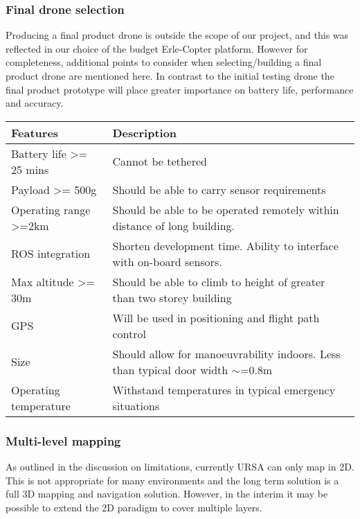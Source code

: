 \documentclass[capstone_report.tex]{subfiles}
\begin{document}
\subsubsection{Final drone selection}
Producing a final product drone is outside the scope of our project, and this was reflected in our choice of the budget Erle-Copter platform. However for completeness, additional points to consider when selecting/building a final product drone are mentioned here.  In contrast to the initial testing drone the final product prototype will place greater importance on battery life, performance and accuracy.

\begin{table}[H]
\centering
\label{final_requirements}
\begin{tabular}{p{6cm}p{8cm}}
\toprule
Features                           & Description                                                                         \\ \midrule
Battery life \textgreater= 25 mins & Cannot be tethered                                                                  \\
Payload \textgreater= 500g         & Should be able to carry sensor requirements                                         \\
Operating range \textgreater=2km   & Should be able to be operated remotely within distance of long building.            \\
ROS integration                    & Shorten development time.  Ability to interface with on-board sensors.              \\
Max altitude \textgreater= 30m     & Should be able to climb to height of greater than two storey building               \\
GPS                                & Will be used in positioning and flight path control                                 \\
Size                               & Should allow for manoeuvrability indoors.  Less than typical door width $\sim$=0.8m \\
Operating temperature              & Withstand temperatures in typical emergency situations                              \\ \bottomrule
\end{tabular}
\end{table}

\subsubsection{Multi-level mapping}
As outlined in the discussion on limitations, currently URSA can only map in 2D. This is not appropriate for many environments and the long term solution is a full 3D mapping and navigation solution. However, in the interim it may be possible to extend the 2D paradigm to cover multiple layers. \\
\end{document}

